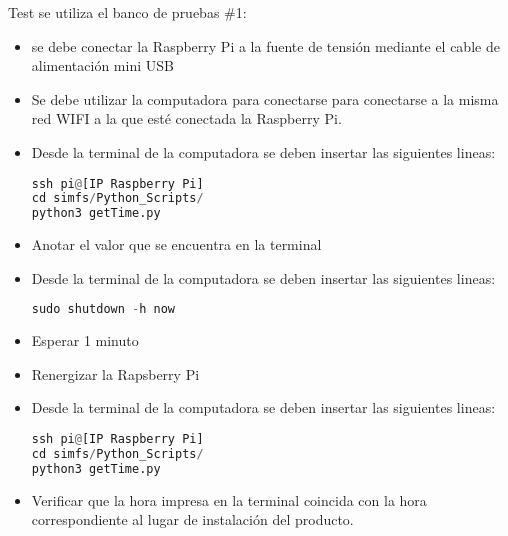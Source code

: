 Test \TBC se utiliza el banco de pruebas \#1:
\begin{itemize}
\item se debe conectar la Raspberry Pi a la fuente de tensión mediante el cable de alimentación mini USB
\item Se debe utilizar la computadora para conectarse para conectarse a la misma red WIFI a la que esté conectada la Raspberry Pi.
\item Desde la terminal de la computadora se deben insertar las siguientes lineas:
\begin{lstlisting}[language=Python]
ssh pi@[IP Raspberry Pi] 
cd simfs/Python_Scripts/
python3 getTime.py
\end{lstlisting}
\item Anotar el valor que se encuentra en la terminal
\item Desde la terminal de la computadora se deben insertar las siguientes lineas:
\begin{lstlisting}[language=Python]
sudo shutdown -h now
\end{lstlisting}
\item Esperar 1 minuto
\item Renergizar la Rapsberry Pi
\item Desde la terminal de la computadora se deben insertar las siguientes lineas:
\begin{lstlisting}[language=Python]
ssh pi@[IP Raspberry Pi] 
cd simfs/Python_Scripts/
python3 getTime.py
\end{lstlisting}
\item Verificar que la hora impresa en la terminal coincida con la hora correspondiente al lugar de instalación del producto.
\end{itemize}


